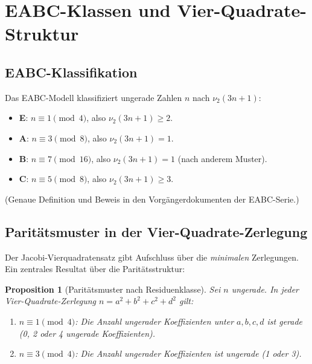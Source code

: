 \documentclass[12pt,a4paper]{article}
\newtheorem{proposition}[definition]{Proposition}
\newcommand{\vii}{\nu_2}
\begin{document}
\section{EABC-Klassen und Vier-Quadrate-Struktur}
\label{sec:eabc}

\subsection{EABC-Klassifikation}

Das EABC-Modell klassifiziert ungerade Zahlen $n$ nach $\vii(3n+1)$:
\begin{itemize}[noitemsep]
  \item \textbf{E}: $n \equiv 1 \pmod{4}$, also $\vii(3n+1) \geq 2$.
  \item \textbf{A}: $n \equiv 3 \pmod{8}$, also $\vii(3n+1) = 1$.
  \item \textbf{B}: $n \equiv 7 \pmod{16}$, also $\vii(3n+1) = 1$ (nach anderem Muster).
  \item \textbf{C}: $n \equiv 5 \pmod{8}$, also $\vii(3n+1) \geq 3$.
\end{itemize}
(Genaue Definition und Beweis in den Vorgängerdokumenten der EABC-Serie.)

\subsection{Paritätsmuster in der Vier-Quadrate-Zerlegung}

Der Jacobi-Vierquadratensatz gibt Aufschluss über die \emph{minimalen} Zerlegungen.
Ein zentrales Resultat über die Paritätsstruktur:

\begin{proposition}[Paritätsmuster nach Residuenklasse]
\label{prop:paritaet}
Sei $n$ ungerade. In jeder Vier-Quadrate-Zerlegung $n = a^2+b^2+c^2+d^2$ gilt:
\begin{enumerate}[label=(\roman*), noitemsep]
  \item $n \equiv 1 \pmod{4}$: Die Anzahl ungerader Koeffizienten unter $a,b,c,d$ ist
        gerade (0, 2 oder 4 ungerade Koeffizienten).
  \item $n \equiv 3 \pmod{4}$: Die Anzahl ungerader Koeffizienten ist ungerade (1 oder 3).
\end{enumerate}
\end{proposition}
\end{document}
